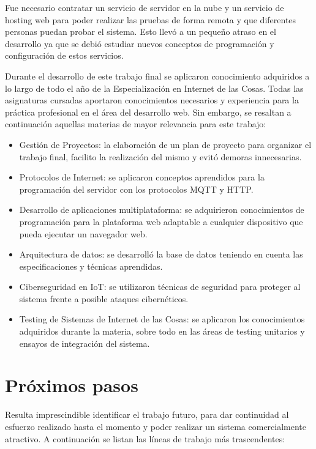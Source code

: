 Fue necesario contratar un servicio de servidor en la nube y un servicio de hosting web para poder realizar las pruebas de forma remota y que diferentes personas puedan probar el sistema. Esto llevó a un pequeño atraso en el desarrollo ya que se debió estudiar nuevos conceptos de programación y configuración de estos servicios. 

Durante el desarrollo de este trabajo final se aplicaron conocimiento adquiridos a lo largo de todo el año de la Especialización en Internet de las Cosas. Todas las asignaturas cursadas aportaron conocimientos necesarios y experiencia para la práctica profesional en el área del desarrollo web.  Sin embargo, se resaltan a continuación aquellas materias de mayor relevancia para este trabajo:

\begin{itemize}
	\item Gestión de Proyectos: la elaboración de un plan de proyecto para organizar el trabajo final, facilito la realización del mismo y evitó demoras innecesarias. 
	\item Protocolos de Internet: se aplicaron conceptos aprendidos para la programación del servidor con los protocolos MQTT y HTTP.
	\item Desarrollo de aplicaciones multiplataforma: se adquirieron conocimientos de programación para la plataforma web adaptable a cualquier dispositivo que pueda ejecutar un navegador web.
	\item Arquitectura de datos: se desarrolló la base de datos teniendo en cuenta las especificaciones y técnicas aprendidas. 
	\item Ciberseguridad en IoT: se utilizaron técnicas de seguridad para proteger al sistema frente a posible ataques cibernéticos. 
	\item Testing de Sistemas de Internet de las Cosas: se aplicaron los conocimientos adquiridos durante la materia, sobre todo en las áreas de testing unitarios y ensayos de integración del sistema.
\end{itemize}


\section{Próximos pasos}

Resulta imprescindible identificar el trabajo futuro, para dar continuidad al esfuerzo realizado hasta el momento y poder realizar un sistema comercialmente atractivo. A continuación se listan las líneas de trabajo más trascendentes:

